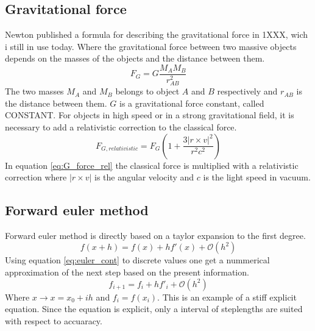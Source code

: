 \documentclass[twoside,twocolumn]{article}
\begin{document}
\subsection{Gravitational force}
Newton published a formula for describing the gravitational force in 1XXX, wich i still in use today. Where the gravitational force between two massive objects depends on the masses of the objects and the distance between them.
\begin{equation}
F_G = G\frac{M_AM_B}{r_{AB}^2} \label{eq:G_force}
\end{equation}
The two masses $M_A$ and $M_B$ belongs to object $A$ and $B$ respectively and $r_{AB}$ is the distance between them. $G$ is a gravitational force constant, called CONSTANT.
For objects in high speed or in a strong gravitational field, it is necessary to add a relativistic correction to the classical force. 
\begin{equation}
F_{G,relativistic}= F_{G}\left(1+\frac{3|r\times v|^2}{r^2c^2}\right) \label{eq:G_force_rel}
\end{equation}
In equation \ref{eq:G_force_rel} the classical force is multiplied with a relativistic correction where $|r\times v|$ is the angular velocity and $c$ is the light speed in vacuum.

\subsection{Forward euler method}
Forward euler method is directly based on a taylor expansion to the first degree.
\begin{equation}
f(x+h)=f(x)+hf'(x)+\mathcal{O}(h^2) \label{eq:euler_cont}
\end{equation}
Using equation \ref{eq:euler_cont} to discrete values one get a nummerical approximation of the next step based on the present information. 
\begin{equation}
f_{i+1}=f_i+hf'_i+\mathcal{O}(h^2) \label{eq:euler_disc}
\end{equation}
Where $x\rightarrow x=x_0+ih$ and $f_i=f(x_i)$. This is an example of a stiff explicit equation. Since the equation is explicit, only a interval of steplengths are suited with respect to accuaracy.
\end{document}
